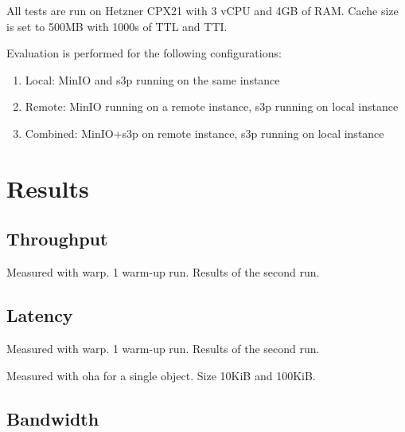All tests are run on Hetzner CPX21 with 3 vCPU and 4GB of RAM.
Cache size is set to 500MB with 1000s of TTL and TTI.

Evaluation is performed for the following configurations:
\begin{enumerate}
	\item Local: MinIO and s3p running on the same instance
	\item Remote: MinIO running on a remote instance, s3p running on local instance
	\item Combined: MinIO+s3p on remote instance, s3p running on local instance 
\end{enumerate}


\section{Results}
\subsection{Throughput}

Measured with warp. 1 warm-up run. Results of the second run.
\subsection{Latency}

Measured with warp. 1 warm-up run. Results of the second run.

Measured with oha for a single object. Size 10KiB and 100KiB.

\subsection{Bandwidth}